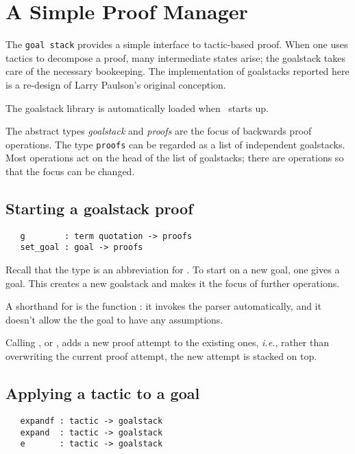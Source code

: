 \section{A Simple Proof Manager}\label{sec:goalstack}

The \texttt{goal stack} provides a simple interface to tactic-based
proof. When one uses tactics to decompose a proof, many intermediate
states arise; the goalstack takes care of the necessary bookeeping. The
implementation of goalstacks reported here is a re-design of Larry
Paulson's original conception.

The goalstack library is automatically loaded when \HOL\ starts up.

The abstract types \textit{goalstack} and \textit{proofs} are the
focus of backwards proof operations. The type \verb+proofs+ can be
regarded as a list of independent goalstacks. Most operations act on
the head of the list of goalstacks; there are operations so that the
focus can be changed.

\subsection{Starting a goalstack proof}

\begin{verbatim}
   g        : term quotation -> proofs
   set_goal : goal -> proofs
\end{verbatim}

Recall that the type  is an abbreviation for
. To start on a new goal, one gives
 a goal. This creates a new goalstack and makes it the
focus of further operations.

A shorthand for  is the function : it
invokes the parser automatically, and it doesn't allow the the goal to
have any assumptions.

Calling , or , adds a new proof attempt to the
existing ones, \textit{i.e.}, rather than overwriting the current
proof attempt, the new attempt is stacked on top.

\subsection{Applying a tactic to a goal}

\begin{verbatim}
   expandf : tactic -> goalstack
   expand  : tactic -> goalstack
   e       : tactic -> goalstack
\end{verbatim}

